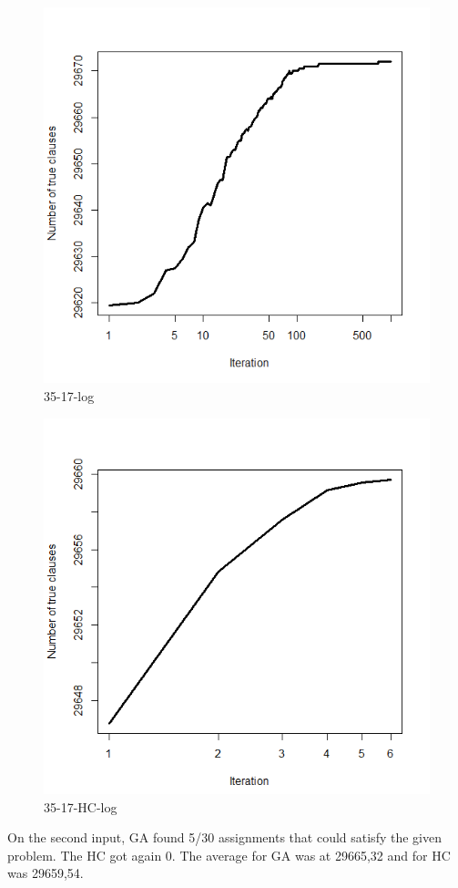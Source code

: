 \documentclass{article}
\begin{document}
\begin{figure}[H]
  \includegraphics[width=\linewidth]{35-17-log.png}
  \caption{35-17-log}
\end{figure}
\begin{figure}[H]
  \includegraphics[width=\linewidth]{35-17-HC-log.png}
  \caption{35-17-HC-log}
\end{figure}
On the second input, GA found 5/30 assignments that could satisfy the given problem. The HC got again 0.
The average for GA was at 29665,32 and for HC was 29659,54.
\end{document}

